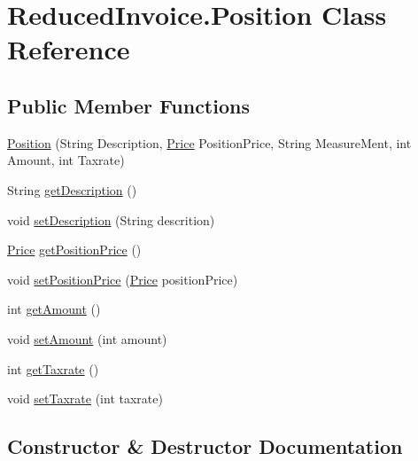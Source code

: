 \hypertarget{class_reduced_invoice_1_1_position}{}\section{Reduced\+Invoice.\+Position Class Reference}
\label{class_reduced_invoice_1_1_position}
\subsection*{Public Member Functions}
\begin{DoxyCompactItemize}
\item 
\hyperlink{class_reduced_invoice_1_1_position_a2668f00d53cf5704f047f300f77a42ad}{Position} (String Description, \hyperlink{class_reduced_invoice_1_1_price}{Price} Position\+Price, String Measure\+Ment, int Amount, int Taxrate)
\item 
String \hyperlink{class_reduced_invoice_1_1_position_ab4c6da1a734c40337974e76ea4491dbf}{get\+Description} ()
\item 
void \hyperlink{class_reduced_invoice_1_1_position_a86b0bb99ef806d0e8298e8b5030f8964}{set\+Description} (String descrition)
\item 
\hyperlink{class_reduced_invoice_1_1_price}{Price} \hyperlink{class_reduced_invoice_1_1_position_ace39a33b2c836d4689b4eae38f6c3ca3}{get\+Position\+Price} ()
\item 
void \hyperlink{class_reduced_invoice_1_1_position_aeac9fdead656ad61a41dbca42a4d8fdd}{set\+Position\+Price} (\hyperlink{class_reduced_invoice_1_1_price}{Price} position\+Price)
\item 
int \hyperlink{class_reduced_invoice_1_1_position_a5f2aa6f49886d3186e53e76a55dfdf91}{get\+Amount} ()
\item 
void \hyperlink{class_reduced_invoice_1_1_position_afd4c38ea287c5e39f5537673f4efc1ce}{set\+Amount} (int amount)
\item 
int \hyperlink{class_reduced_invoice_1_1_position_ae6fa813dd7b205c91b5d340e467751da}{get\+Taxrate} ()
\item 
void \hyperlink{class_reduced_invoice_1_1_position_a44eab6fd92814298a7e34ff1ffd13422}{set\+Taxrate} (int taxrate)
\end{DoxyCompactItemize}


\subsection{Constructor \& Destructor Documentation}
